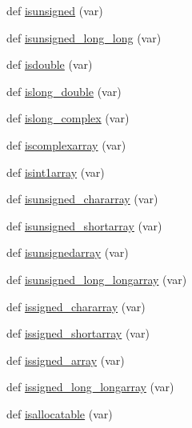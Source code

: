 \begin{DoxyCompactItemize}
\item 
def \hyperlink{namespacenumpy_1_1f2py_1_1auxfuncs_aec66d0c4ae79adb6269ea98bc0b845ce}{isunsigned} (var)
\item 
def \hyperlink{namespacenumpy_1_1f2py_1_1auxfuncs_a63160455e423a737fc5d54989c3ff31d}{isunsigned\+\_\+long\+\_\+long} (var)
\item 
def \hyperlink{namespacenumpy_1_1f2py_1_1auxfuncs_a3d98f88b93a2751011c02a5b6627ecb7}{isdouble} (var)
\item 
def \hyperlink{namespacenumpy_1_1f2py_1_1auxfuncs_a1fcb0a67c24247ae510056f62eb359ab}{islong\+\_\+double} (var)
\item 
def \hyperlink{namespacenumpy_1_1f2py_1_1auxfuncs_ab061c555fbce32abf348f9c0ebc5e279}{islong\+\_\+complex} (var)
\item 
def \hyperlink{namespacenumpy_1_1f2py_1_1auxfuncs_aac5a02f24ea1e75b74bd55b840dc62f0}{iscomplexarray} (var)
\item 
def \hyperlink{namespacenumpy_1_1f2py_1_1auxfuncs_afe74a450a695d55bc62b5926425879d1}{isint1array} (var)
\item 
def \hyperlink{namespacenumpy_1_1f2py_1_1auxfuncs_a01241d5f94004f2f23ce7060a73fb310}{isunsigned\+\_\+chararray} (var)
\item 
def \hyperlink{namespacenumpy_1_1f2py_1_1auxfuncs_a6ed45b291c2c2bd26c0ea3bf0fe9c8b5}{isunsigned\+\_\+shortarray} (var)
\item 
def \hyperlink{namespacenumpy_1_1f2py_1_1auxfuncs_a6351551de897d5cc50d2082e561db903}{isunsignedarray} (var)
\item 
def \hyperlink{namespacenumpy_1_1f2py_1_1auxfuncs_a7de3eeb51eba5852b71e8b35fbdcc737}{isunsigned\+\_\+long\+\_\+longarray} (var)
\item 
def \hyperlink{namespacenumpy_1_1f2py_1_1auxfuncs_abf5bccd7762fcf7819981bcbb7c1b8e8}{issigned\+\_\+chararray} (var)
\item 
def \hyperlink{namespacenumpy_1_1f2py_1_1auxfuncs_a66ded04d7381e61428554b605355adb7}{issigned\+\_\+shortarray} (var)
\item 
def \hyperlink{namespacenumpy_1_1f2py_1_1auxfuncs_a308e8ad77f4e3ba8b71b3ae4c7774329}{issigned\+\_\+array} (var)
\item 
def \hyperlink{namespacenumpy_1_1f2py_1_1auxfuncs_aab4f617f68def3bf0bc7bda7553ca4f8}{issigned\+\_\+long\+\_\+longarray} (var)
\item 
def \hyperlink{namespacenumpy_1_1f2py_1_1auxfuncs_abc4dfac5769cb38d2c4c5393b30294a9}{isallocatable} (var)
\item 

\end{DoxyCompactItemize}
